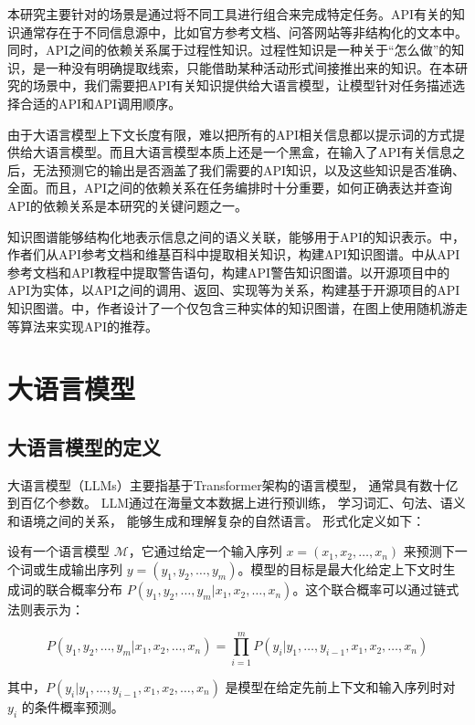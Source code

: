 本研究主要针对的场景是通过将不同工具进行组合来完成特定任务。API有关的知识通常存在于不同信息源中，比如官方参考文档、问答网站等非结构化的文本中\cite{Ma}。同时，API之间的依赖关系属于过程性知识。过程性知识是一种关于“怎么做”的知识，是一种没有明确提取线索，只能借助某种活动形式间接推出来的知识。在本研究的场景中，我们需要把API有关知识提供给大语言模型，让模型针对任务描述选择合适的API和API调用顺序。

由于大语言模型上下文长度有限，难以把所有的API相关信息都以提示词的方式提供给大语言模型。而且大语言模型本质上还是一个黑盒，在输入了API有关信息之后，无法预测它的输出是否涵盖了我们需要的API知识，以及这些知识是否准确、全面。而且，API之间的依赖关系在任务编排时十分重要，如何正确表达并查询API的依赖关系是本研究的关键问题之一。

知识图谱能够结构化地表示信息之间的语义关联，能够用于API的知识表示。\cite{Liu2019}中，作者们从API参考文档和维基百科中提取相关知识，构建API知识图谱。\cite{Li2018}中从API参考文档和API教程中提取警告语句，构建API警告知识图谱。\cite{Ling2019}以开源项目中的API为实体，以API之间的调用、返回、实现等为关系，构建基于开源项目的API知识图谱。\cite{Wang2021}中，作者设计了一个仅包含三种实体的知识图谱，在图上使用随机游走等算法来实现API的推荐。

\section{大语言模型}

\subsection{大语言模型的定义}

大语言模型（LLMs）主要指基于Transformer架构的语言模型，
通常具有数十亿到百亿个参数。
LLM通过在海量文本数据上进行预训练，
学习词汇、句法、语义和语境之间的关系，
能够生成和理解复杂的自然语言。
形式化定义如下：

设有一个语言模型 \( \mathcal{M} \)，它通过给定一个输入序列 \( x = (x_1, x_2, \dots, x_n) \) 来预测下一个词或生成输出序列 \( y = (y_1, y_2, \dots, y_m) \)。模型的目标是最大化给定上下文时生成词的联合概率分布 \( P(y_1, y_2, \dots, y_m | x_1, x_2, \dots, x_n) \)。这个联合概率可以通过链式法则表示为：

\[
P(y_1, y_2, \dots, y_m | x_1, x_2, \dots, x_n) = \prod_{i=1}^{m} P(y_i | y_1, \dots, y_{i-1}, x_1, x_2, \dots, x_n)
\]

其中，\( P(y_i | y_1, \dots, y_{i-1}, x_1, x_2, \dots, x_n) \) 是模型在给定先前上下文和输入序列时对 \( y_i \) 的条件概率预测。

